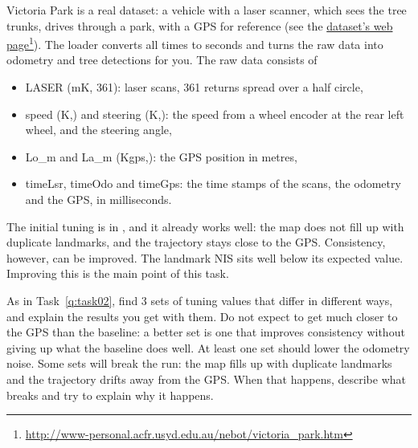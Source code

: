 \label{q:task03}
Victoria Park is a real dataset: a vehicle with a laser scanner, which sees the tree trunks, drives through a park, with a GPS for reference (see the \href{http://www-personal.acfr.usyd.edu.au/nebot/victoria_park.htm}{dataset's web page}\footnote{\href{http://www-personal.acfr.usyd.edu.au/nebot/victoria_park.htm}{http://www-personal.acfr.usyd.edu.au/nebot/victoria\_park.htm}}). The loader converts all times to seconds and turns the raw data into odometry and tree detections for you. The raw data consists of
\begin{itemize}
    \item LASER (mK, 361): laser scans, 361 returns spread over a half circle,
    \item speed (K,) and steering (K,): the speed from a wheel encoder at the rear left wheel, and the steering angle,
    \item Lo\_m and La\_m (Kgps,): the GPS position in metres,
    \item timeLsr, timeOdo and timeGps: the time stamps of the scans, the odometry and the GPS, in milliseconds.
\end{itemize}

The initial tuning is in , and it already works well: the map does not fill up with duplicate landmarks, and the trajectory stays close to the GPS. Consistency, however, can be improved. The landmark NIS sits well below its expected value. Improving this is the main point of this task.

As in Task~\ref{q:task02}, find 3 sets of tuning values that differ in different ways, and explain the results you get with them. Do not expect to get much closer to the GPS than the baseline: a better set is one that improves consistency without giving up what the baseline does well. At least one set should lower the odometry noise. Some sets will break the run: the map fills up with duplicate landmarks and the trajectory drifts away from the GPS. When that happens, describe what breaks and try to explain why it happens.

